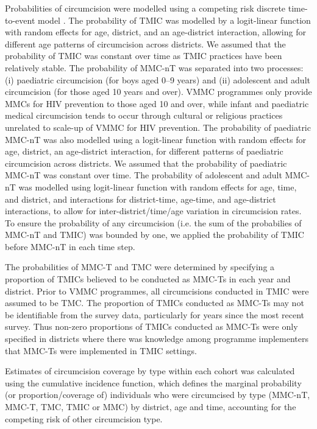 \documentclass{article}
\begin{document}
Probabilities of circumcision were modelled using a competing risk discrete time-to-event model \cite{putter2006tutorial}. The probability of TMIC was modelled by a logit-linear function with random effects for age, district, and an age-district interaction, allowing for different age patterns of circumcision across districts. We assumed that the probability of TMIC was constant over time as TMIC practices have been relatively stable. The probability of MMC-nT was separated into two processes: (i) paediatric circumcision (for boys aged 0--9 years) and (ii) adolescent and adult circumcision (for those aged 10 years and over). VMMC programmes only provide MMCs for HIV prevention to those aged 10 and over, while infant and paediatric medical circumcision tends to occur through cultural or religious practices unrelated to scale-up of VMMC for HIV prevention. The probability of paediatric MMC-nT was also modelled using a logit-linear function with random effects for age, district, an age-district interaction, for different patterns of paediatric circumcision across districts. We assumed that the probability of paediatric MMC-nT was constant over time. The probability of adolescent and adult MMC-nT was modelled using logit-linear function with random effects for age, time, and district, and interactions for district-time, age-time, and age-district interactions, to allow for inter-district/time/age variation in circumcision rates. To ensure the probability of any circumcision (i.e. the sum of the probabilies of MMC-nT and TMIC) was bounded by one, we applied the probability of TMIC before MMC-nT in each time step. 

The probabilities of MMC-T and TMC were determined by specifying a proportion of TMICs believed to be conducted as MMC-Ts in each year and district. Prior to VMMC programmes, all circumcisions conducted in TMIC were assumed to be TMC. The proportion of TMICs conducted as MMC-Ts may not be identifiable from the survey data, particularly for years since the most recent survey. Thus non-zero proportions of TMICs conducted as MMC-Ts were only specified in districts where there was knowledge among programme implementers that MMC-Ts were implemented in TMIC settings. 

Estimates of circumcision coverage by type within each cohort was calculated using the cumulative incidence function, which defines the marginal probability (or proportion/coverage of) individuals who were circumcised by type (MMC-nT, MMC-T, TMC, TMIC or MMC) by district, age and time, accounting for the competing risk of other circumcision type.
\end{document}
